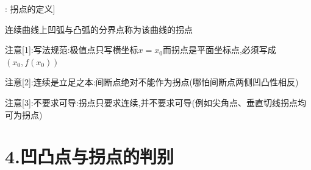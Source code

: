 \documentclass[11pt,a4paper,UTF8]{ctexart}
\begin{document}
\begin{thmbox}[原理[3]: 拐点的定义]

连续曲线上凹弧与凸弧的分界点称为该曲线的拐点

注意[1]:写法规范:极值点只写横坐标$x = x_0$而拐点是平面坐标点,必须写成$(x_0, f(x_0))$

注意[2]:连续是立足之本:间断点绝对不能作为拐点(哪怕间断点两侧凹凸性相反)

注意[3]:不要求可导:拐点只要求连续,并不要求可导(例如尖角点、垂直切线拐点均可为拐点)

\end{thmbox}

\section{4.凹凸点与拐点的判别}
\end{document}
